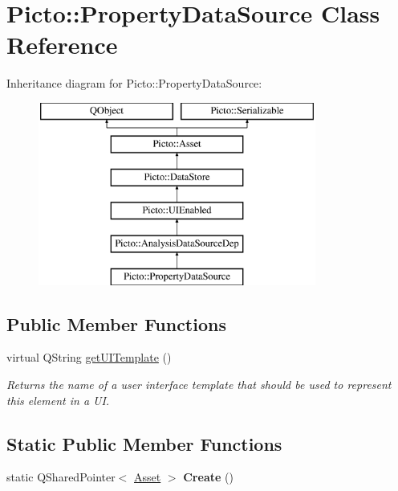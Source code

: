 \hypertarget{class_picto_1_1_property_data_source}{\section{Picto\-:\-:Property\-Data\-Source Class Reference}
\label{class_picto_1_1_property_data_source}
}
Inheritance diagram for Picto\-:\-:Property\-Data\-Source\-:\begin{figure}[H]
\begin{center}
\leavevmode
\includegraphics[height=6.000000cm]{class_picto_1_1_property_data_source}
\end{center}
\end{figure}
\subsection*{Public Member Functions}
\begin{DoxyCompactItemize}
\item 
\hypertarget{class_picto_1_1_property_data_source_afdafb7a29a54ac63cf4435d924516327}{virtual Q\-String \hyperlink{class_picto_1_1_property_data_source_afdafb7a29a54ac63cf4435d924516327}{get\-U\-I\-Template} ()}\label{class_picto_1_1_property_data_source_afdafb7a29a54ac63cf4435d924516327}

\begin{DoxyCompactList}\small\item\em Returns the name of a user interface template that should be used to represent this element in a U\-I. \end{DoxyCompactList}\end{DoxyCompactItemize}
\subsection*{Static Public Member Functions}
\begin{DoxyCompactItemize}
\item 
\hypertarget{class_picto_1_1_property_data_source_afc4002f17ca7bcb9c5cc7bf4422e5823}{static Q\-Shared\-Pointer$<$ \hyperlink{class_picto_1_1_asset}{Asset} $>$ {\bfseries Create} ()}\label{class_picto_1_1_property_data_source_afc4002f17ca7bcb9c5cc7bf4422e5823}

\end{DoxyCompactItemize}
